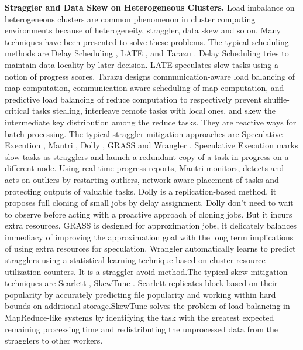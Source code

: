 \documentclass[10pt,conference,compsocconf,letterpaper]{IEEEtran}
\begin{document}
  \textbf{Straggler and Data Skew on Heterogeneous Clusters.} Load imbalance on heterogeneous clusters are common phenomenon in cluster computing environments because of heterogeneity, straggler, data skew and so on. Many techniques have been presented to solve these problems. The typical scheduling methods are Delay Scheduling \cite{Zaharia2010B}, LATE \cite{Zaharia2008}, and Tarazu \cite{Ahmad2012}. Delay Scheduling tries to maintain data locality by later decision. LATE speculates slow tasks using a notion of progress scores. Tarazu designs communication-aware load balancing of map computation, communication-aware scheduling of map computation, and predictive load balancing of reduce computation to respectively prevent shuffle-critical tasks stealing, interleave remote tasks with local ones, and skew the intermediate key distribution among the reduce tasks. They are reactive ways for batch processing. The typical straggler mitigation approaches are Speculative Execution \cite{Dean2004}, Mantri \cite{Ananthanarayanan2010}, Dolly \cite{Ananthanarayanan2013}, GRASS \cite{Ananthanarayanan2014} and Wrangler \cite{Yadwadkar2014}. Speculative Execution marks slow tasks as stragglers and launch a redundant copy of a task-in-progress on a different node. Using real-time progress reports, Mantri monitors, detects and acts on outliers by restarting outliers, network-aware placement of tasks and protecting outputs of valuable tasks. Dolly is a replication-based method, it proposes full cloning of small jobs by delay assignment. Dolly don't need to wait to observe before acting with a proactive approach of cloning jobs. But it incurs extra resources. GRASS is designed for approximation jobs, it delicately balances immediacy of improving the approximation goal with the long term implications of using extra resources for speculation. Wrangler automatically learns to predict stragglers using a statistical learning technique based on cluster resource utilization counters. It is a straggler-avoid method.The typical skew mitigation techniques are Scarlett \cite{Ananthanarayanan2011}, SkewTune \cite{Kwon2012}. Scarlett replicates block based on their popularity by accurately predicting file popularity and working within hard bounds on additional storage.SkewTune solves the problem of load balancing in MapReduce-like systems by identifying the task with the greatest expected remaining processing time and redistributing the unprocessed data from the stragglers to other workers.
\end{document}
